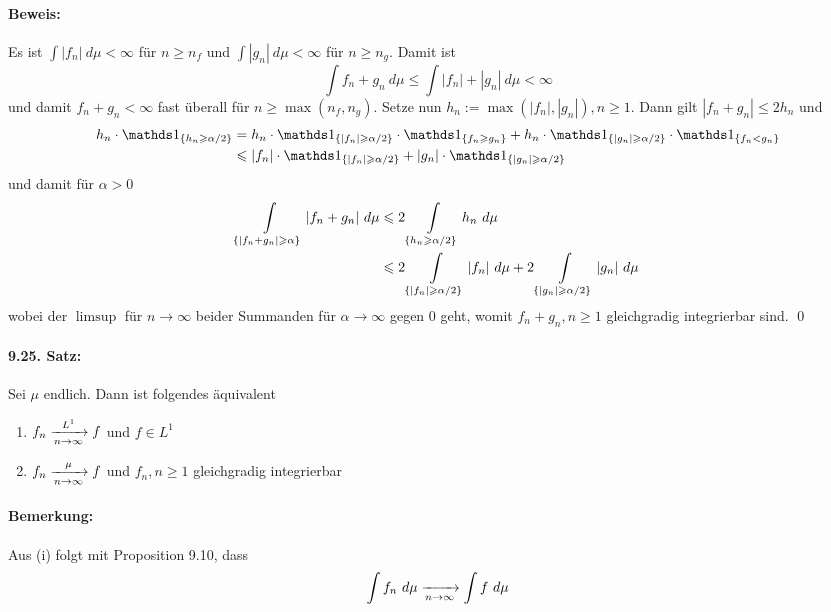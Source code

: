 \paragraph{Beweis:}Es ist $\int|f_n|\ d\mu<\infty$ f\"ur $n\geq n_f$ und $\int|g_n|\ d\mu<\infty$ f\"ur $n\geq n_g$. Damit ist 
$$\int f_n+g_n\ d\mu\leq\int|f_n|+|g_n|\ d\mu<\infty$$
und damit $f_n+g_n<\infty$ fast \"uberall f\"ur $n\geq\max(n_f,n_g)$. \newline\newline
Setze nun $h_n:=\max(|f_n|,|g_n|),n\geq1$. Dann gilt $|f_n+g_n|\leq 2h_n$ und 
\begin{align*}
    h_n\cdot\ind{\{h_n\geq\alpha/2\}}&=h_n\cdot\ind{\{|f_n|\geq\alpha/2\}}\cdot\ind{\{f_n\geq g_n\}}+h_n\cdot\ind{\{|g_n|\geq\alpha/2\}}\cdot\ind{\{f_n< g_n\}}\\
    &\leq|f_n|\cdot\ind{\{|f_n|\geq\alpha/2\}}+|g_n|\cdot\ind{\{|g_n|\geq\alpha/2\}}
\end{align*}
und damit f\"ur $\alpha>0$
\begin{align*}
    \int\displaylimits_{\{|f_n+g_n|\geq\alpha\}}|f_n+g_n|\ d\mu&\leq2\int\displaylimits_{\{h_n\geq\alpha/2\}}h_n\ d\mu\\
    &\leq2\int\displaylimits_{\{|f_n|\geq\alpha/2\}}|f_n|\ d\mu+2\int\displaylimits_{\{|g_n|\geq\alpha/2\}}|g_n|\ d\mu
\end{align*} 
wobei der $\limsup$ f\"ur $n\to\infty$ beider Summanden f\"ur $\alpha\to\infty$ gegen $0$ geht, womit $f_n+g_n,n\geq1$ gleichgradig integrierbar sind. \qed

\paragraph{9.25. Satz:}Sei $\mu$ endlich. Dann ist folgendes \"aquivalent
\begin{enumerate}[label=(\roman*)]
    \item $f_n\nto{L^1}{n\to\infty}f$ und $f\in L^1 $
    \item $f_n\nto{\mu}{n\to\infty}f$ und $f_n,n\geq1$ gleichgradig integrierbar
\end{enumerate}

\paragraph{Bemerkung:}Aus (i) folgt mit Proposition 9.10, dass 
$$\int f_n\ d\mu\nto{}{n\to\infty}\int f\ d\mu$$

